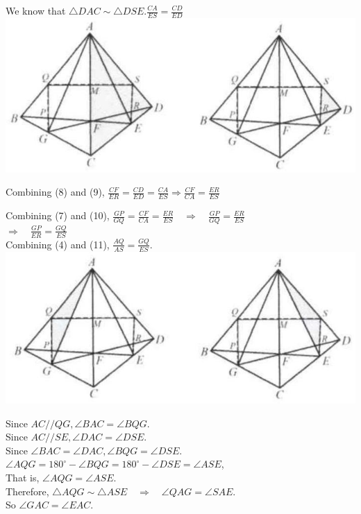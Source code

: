 \documentclass{article}
\begin{document}
We know that \(\triangle D A C \sim \triangle D S E . \frac{C A}{E S}=\frac{C D}{E D}\)\\
\centering
\includegraphics[width=\textwidth]{images/144.jpg}

Combining (8) and (9), \(\frac{C F}{E R}=\frac{C D}{E D}=\frac{C A}{E S} \Rightarrow \frac{C F}{C A}=\frac{E R}{E S}\)

Combining (7) and (10), \(\frac{G P}{G Q}=\frac{C F}{C A}=\frac{E R}{E S} \quad \Rightarrow \quad \frac{G P}{G Q}=\frac{E R}{E S}\)\\
\(\Rightarrow \quad \frac{G P}{E R}=\frac{G Q}{E S}\)\\
Combining (4) and (11), \(\frac{A Q}{A S}=\frac{G Q}{E S}\).\\
\centering
\includegraphics[width=\textwidth]{images/145.jpg}

Since \(A C / / Q G, \angle B A C=\angle B Q G\).\\
Since \(A C / / S E, \angle D A C=\angle D S E\).\\
Since \(\angle B A C=\angle D A C, \angle B Q G=\angle D S E\).\\
\(\angle A Q G=180^{\circ}-\angle B Q G=180^{\circ}-\angle D S E=\angle A S E\),\\
That is, \(\angle A Q G=\angle A S E\).\\
Therefore, \(\triangle A Q G \sim \triangle A S E \quad \Rightarrow \quad \angle Q A G=\angle S A E\).\\
So \(\angle G A C=\angle E A C\).
\end{document}
